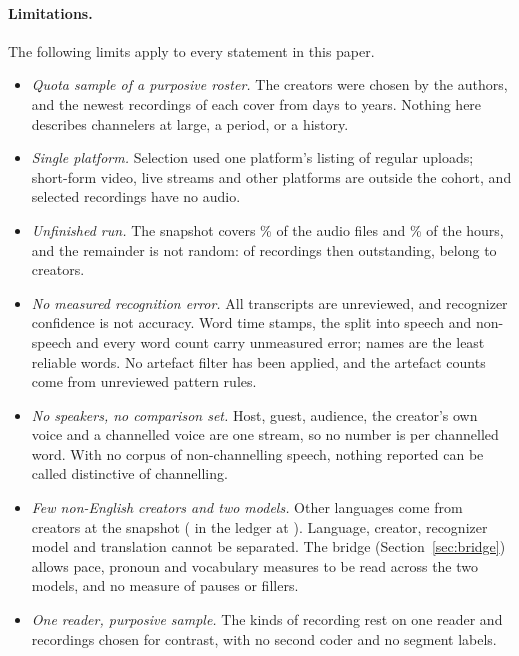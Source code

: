 \documentclass[letterpaper]{article} %
\begin{document}
\paragraph{Limitations.} The following limits apply to every statement in this paper.
\begin{itemize}
\item \emph{Quota sample of a purposive roster.} The creators were chosen by the authors, and the newest \NPerCreator{} recordings of each cover from \SpanMin{} days to \SpanMaxYears{} years. Nothing here describes channelers at large, a period, or a history.
\item \emph{Single platform.} Selection used one platform's listing of regular uploads; short-form video, live streams and other platforms are outside the cohort, and \NFailed{} selected recordings have no audio.
\item \emph{Unfinished run.} The snapshot covers \SnapPctAudio\% of the audio files and \SnapPctHours\% of the hours, and the remainder is not random: of \SnapNotInLedger{} recordings then outstanding, \SnapNotInLedgerConcentrated{} belong to \SnapNotInLedgerCreators{} creators.
\item \emph{No measured recognition error.} All transcripts are unreviewed, and recognizer confidence is not accuracy. Word time stamps, the split into speech and non-speech and every word count carry unmeasured error; names are the least reliable words. No artefact filter has been applied, and the artefact counts come from unreviewed pattern rules.
\item \emph{No speakers, no comparison set.} Host, guest, audience, the creator's own voice and a channelled voice are one stream, so no number is per channelled word. With no corpus of non-channelling speech, nothing reported can be called distinctive of channelling.
\item \emph{Few non-English creators and two models.} Other languages come from \SnapNonEnglishCreators{} creators at the snapshot (\NowNonEnglishCreators{} in the ledger at \NowStamp). Language, creator, recognizer model and translation cannot be separated. The bridge (Section~\ref{sec:bridge}) allows pace, pronoun and vocabulary measures to be read across the two models, and no measure of pauses or fillers.
\item \emph{One reader, purposive sample.} The kinds of recording rest on one reader and \ReadN{} recordings chosen for contrast, with no second coder and no segment labels.

\end{itemize}
\end{document}
